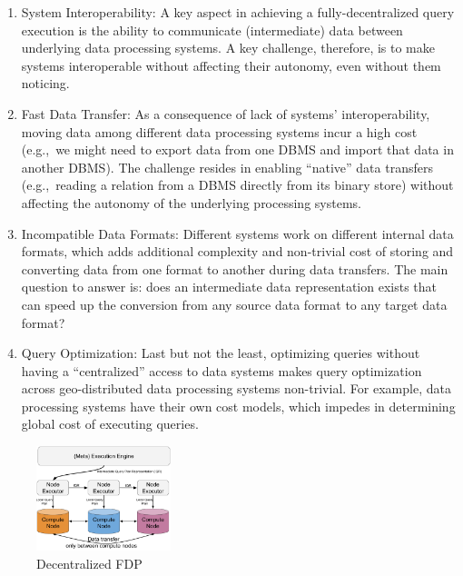 \documentclass[11pt]{article}
\begin{document}
\begin{enumerate}
  \item System Interoperability: A key aspect in achieving
  a fully-decentralized query execution is the ability to
  communicate (intermediate) data between underlying data
  processing systems. A key challenge, therefore, is to make
  systems interoperable without affecting their autonomy,
  even without them noticing.

 \item Fast Data Transfer: As a consequence of lack of
systems' interoperability, moving data among different data
processing systems incur a high cost (e.g.,~we might need to
export data from one DBMS and import that data in another
DBMS). The challenge resides in enabling ``native'' data
transfers (e.g.,~reading a relation from a DBMS directly
from its binary store) without affecting the autonomy of the
underlying processing systems.

\item Incompatible Data Formats: Different systems work on
different internal data formats, which adds additional
complexity and non-trivial cost of storing and converting
data from one format to another during data transfers. The
main question to answer is: does an intermediate data
representation exists that can speed up the conversion from
any source data format to any target data format?

\item Query Optimization: Last but not the least,
optimizing queries without having a ``centralized'' access
to data systems makes query optimization across
geo-distributed data processing systems non-trivial. For
example, data processing systems have their own cost models,
which impedes in determining global cost of executing
queries.

\end{enumerate}



\begin{figure}
\centering
\includegraphics[width=0.35\textwidth]{figs/delegator-based.pdf}
\caption{Decentralized FDP}
\label{fig:delegator-based}
\end{figure}
\end{document}
